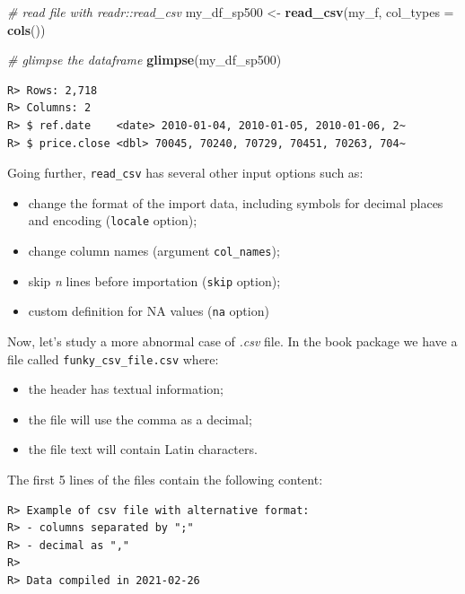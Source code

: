 \documentclass[
  12pt,
]{book}
\newenvironment{Shaded}{\begin{snugshade}}{\end{snugshade}}
\newcommand{\CommentTok}[1]{\textcolor[rgb]{0.37,0.37,0.37}{\textit{#1}}}
\newcommand{\DataTypeTok}[1]{\textcolor[rgb]{0.27,0.27,0.27}{#1}}
\newcommand{\KeywordTok}[1]{\textcolor[rgb]{0.27,0.27,0.27}{\textbf{#1}}}
\newcommand{\NormalTok}[1]{#1}
\newcommand{\StringTok}[1]{\textcolor[rgb]{0.5,0.5,0.5}{#1}}
\providecommand{\tightlist}{%
  \setlength{\itemsep}{0pt}\setlength{\parskip}{0pt}}
\begin{document}
\begin{Shaded}
\begin{Highlighting}[]
\CommentTok{# read file with readr::read_csv}
\NormalTok{my_df_sp500 <-}\StringTok{ }\KeywordTok{read_csv}\NormalTok{(my_f, }
                        \DataTypeTok{col_types =} \KeywordTok{cols}\NormalTok{())}

\CommentTok{# glimpse the dataframe}
\KeywordTok{glimpse}\NormalTok{(my_df_sp500)}
\end{Highlighting}
\end{Shaded}

\begin{verbatim}
R> Rows: 2,718
R> Columns: 2
R> $ ref.date    <date> 2010-01-04, 2010-01-05, 2010-01-06, 2~
R> $ price.close <dbl> 70045, 70240, 70729, 70451, 70263, 704~
\end{verbatim}

Going further, \texttt{read\_csv} has several other input options such as:

\begin{itemize}
\tightlist
\item
  change the format of the import data, including symbols for decimal places and encoding (\texttt{locale} option);
\item
  change column names (argument \texttt{col\_names});
\item
  skip \emph{n} lines before importation (\texttt{skip} option);
\item
  custom definition for NA values (\texttt{na} option)
\end{itemize}

Now, let's study a more abnormal case of \emph{.csv} file. In the book package we have a file called \texttt{funky\_csv\_file.csv} where:

\begin{itemize}
\tightlist
\item
  the header has textual information;
\item
  the file will use the comma as a decimal;
\item
  the file text will contain Latin characters.
\end{itemize}

The first 5 lines of the files contain the following content:

\begin{verbatim}
R> Example of csv file with alternative format:
R> - columns separated by ";"
R> - decimal as ","
R> 
R> Data compiled in 2021-02-26
\end{verbatim}
\end{document}
